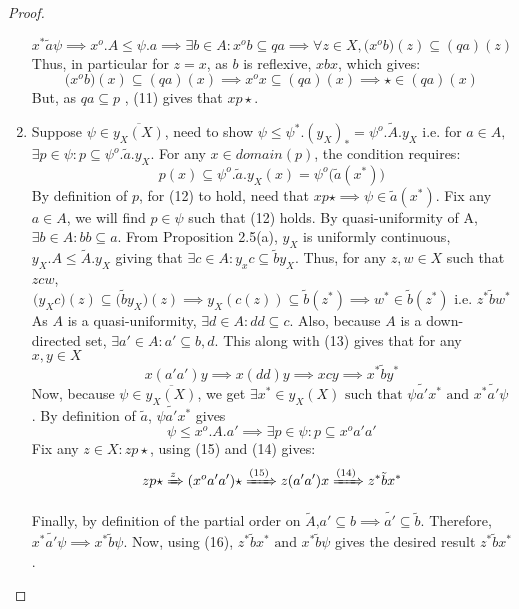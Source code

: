 \documentclass[18pt,a4paper]{article}
\theoremstyle{definition}
\begin{document}
\begin{proof}
\begin{enumerate}[label=(\alph*)]
		\begin{equation} x^* \tilde{a} \psi \implies x^o.A \leq \psi.a
		\implies \exists b\in A: x^ob \subseteq qa
		\implies \forall z \in X, \big(x^o b \big)(z) \subseteq (qa)(z)
	\end{equation}
	Thus, in particular for $z=x$, as $b$ is reflexive, $xbx$, which gives:
	\begin{equation} \big(x^o b \big)(x) \subseteq (qa)(x) \implies x^ox \subseteq (qa)(x) \implies \star \in (qa)(x) \end{equation}
	But, as $qa \subseteq p$ , (11) gives that $xp\star$.
\item Suppose $\psi \in \overline{y_X(X)}$, need to show $\psi \leq \psi^*.(y_X)_*=\psi^o.\tilde{A}.y_X$ i.e.
	for $a \in A,$ $\exists p \in \psi: p \subseteq \psi^o.\tilde{a}.y_X$. For any $x \in domain(p)$,
	the condition requires:
	\begin{equation}
		p(x) \subseteq  \psi^o.\tilde{a} .y_X(x)=\psi^o\big(\tilde{a} (x^*)\big)
	\end{equation}
	By definition of $p$, for (12) to hold, need that $xp\star \implies \psi \in \tilde{a}(x^*) $. Fix
	any $a\in A$, we will find $p \in \psi$ such that (12) holds. By quasi-uniformity of A,
	$\exists b \in A: bb \subseteq a$. From Proposition 2.5(a), $y_X$ is uniformly continuous,
	$y_X.A \leq \tilde{A}.y_X $ giving that $\exists c \in A: y_xc \subseteq \tilde{b}y_X $. Thus, for
	any $z,w\in X$ such that $z c w$,
	\begin{equation} \big(y_X c \big)(z) \subseteq \big(\tilde{b} y_X\big)(z) \implies
	y_X(c(z)) \subseteq \tilde{b}(z^*) \implies w^* \in \tilde{b}(z^*) \text{ i.e. } z^* \tilde{b} w^*
	\end{equation}
	As $A$ is a quasi-uniformity, $\exists d\in A: dd \subseteq c$. Also, because $A$ is a down-
	directed set, $\exists a' \in A: a' \subseteq b,d $. This along with (13) gives that
	for any $x,y \in X$
	\begin{equation} x(a'a')y \implies x(dd)y \implies xcy \implies x^* \tilde{b} y^* \end{equation}
	Now, because $\psi \in \overline{y_X(X)}$, we get
	$\exists x^* \in y_X(X) \text{ such that } \psi \tilde{a'}x^* \text{ and } x^* \tilde{a'} \psi $.
	By definition of $\tilde{a}$, $\psi \tilde{a'}x^*$ gives
	\begin{equation} \psi \leq x^o.A.a' \implies \exists p \in \psi: p \subseteq x^o a'a' \end{equation}
	Fix any $z \in X : zp \star$, using (15) and (14) gives:
	\begin{equation} zp \star \xRightarrow z(x^o a'a') \star \xRightarrow{(15)} z(a'a')x
	 \xRightarrow{(14)} z^* \tilde{b}x^*   \end{equation}

	 Finally, by definition of the partial order on $\tilde{A}$,$a' \subseteq b \implies \tilde{a'}
	 \subseteq \tilde{b} $. Therefore,  $x^* \tilde{a'}\psi \implies x^* \tilde{b}\psi$.
	 Now, using (16), $z^* \tilde{b}x^* \text{ and } x^*\tilde{b}\psi  $ gives the desired result
	 $z^* \tilde{b} x^* $.
\end{enumerate}
\end{proof}
\end{document}
